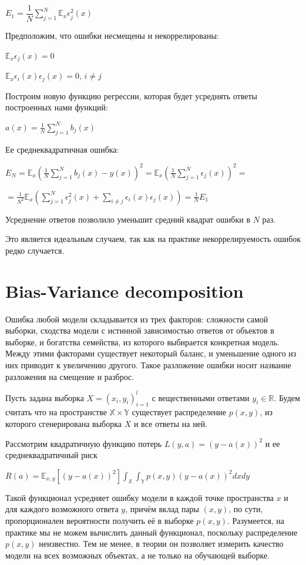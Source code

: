 \documentclass{article}
\begin{document}
$E_1= \dfrac{1}{N}\sum_{j=1}^{N}\mathbb{E}_x\epsilon^2_j(x)$

Предположим, что ошибки несмещены и некоррелированы:

$\mathbb{E}_x\epsilon_j(x) = 0$

$ \mathbb{E}_x\epsilon_i(x)\epsilon_j(x) = 0$,  $i\neq j$

Построим  новую функцию регрессии, которая будет усреднять ответы построенных нами функций:

$a(x) = \frac{1}{N}\sum_{j=1}^{N}b_j(x)$

Ее среднеквадратичная ошибка:

$E_N = \mathbb{E}_x\left(\frac{1}{N}\sum_{j=1}^{N}b_j(x)-y(x)\right)^2 = \mathbb{E}_x\left(\frac{1}{N}\sum_{j=1}^{N}\epsilon_j(x)\right)^2 = $

$=\frac{1}{N^2}\mathbb{E}_x\left(\sum_{j=1}^{N}\epsilon^2_j(x) + \sum_{i\neq j}^{}\epsilon_i(x)\epsilon_j(x)\right)=\frac{1}{N}E_1$

Усреднение ответов позволило уменьшит средний квадрат ошибки в $N$ раз.

Это является идеальным случаем, так как на практике некоррелируемость ошибок редко случается.

\section{Bias-Variance decomposition}

Ошибка любой модели складывается из трех факторов: сложности самой выборки, сходства модели с истинной зависимостью ответов от объектов в выборке, и богатства семейства, из которого выбирается конкретная модель. Между этими факторами существует некоторый баланс, и уменьшение одного из них приводит к увеличению другого. Такое разложение ошибки носит название разложения на смещение и разброс.

Пусть задана выборка $X = (x_i,y_i)^l_{i=1}$ с вещественными ответами $y_i \in \mathbb{R}$. Будем считать что на пространстве $\mathbb{X} \times \mathbb{Y}$ существует распределение $p(x,y)$, из которого сгенерирована выборка $X$ и все ответы на ней.

Рассмотрим квадратичную функцию потерь $L(y,a) = (y-a(x))^2$ и ее среднеквадратичный риск

$R(a) = \mathbb{E}_{x,y}\left[(y-a(x))^2\right] \int_{\mathbb{X}}\int_{\mathbb{Y}} p(x,y)(y-a(x))^2dxdy$

Такой функционал усредняет ошибку модели в каждой точке пространства $x$ и для каждого возможного ответа $y$, причём вклад пары $(x, y)$, по сути, пропорционален вероятности получить её в выборке $p(x, y)$. Разумеется, на практике мы не можем вычислить данный функционал, поскольку распределение $p(x, y)$ неизвестно. Тем не менее, в теории он позволяет измерить качество модели на всех возможных объектах, а не только на обучающей выборке.
\end{document}

